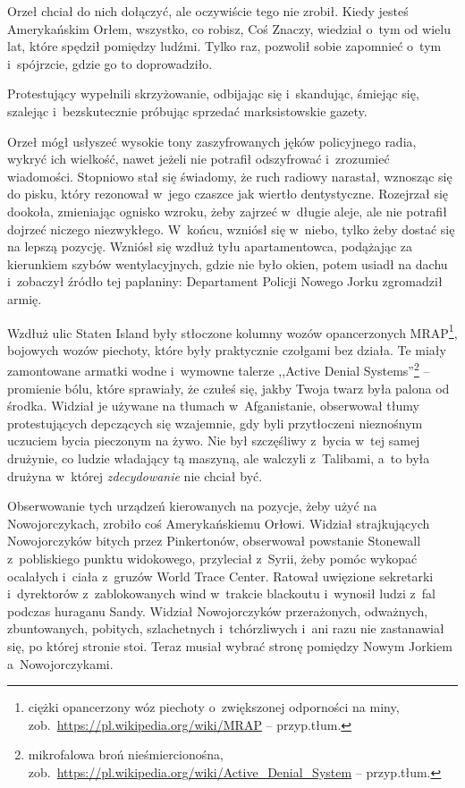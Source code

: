 \documentclass[oneside,polish,11pt,sfheadings]{mwbk}
\begin{document}
Orzeł chciał do nich dołączyć, ale oczywiście tego nie zrobił. Kiedy
jesteś Amerykańskim Orłem, wszystko, co robisz, Coś Znaczy, wiedział o~tym od wielu lat, które spędził pomiędzy ludźmi. Tylko raz, pozwolił
sobie zapomnieć o~tym i~spójrzcie, gdzie go to doprowadziło.

Protestujący wypełnili skrzyżowanie, odbijając się i~skandując, śmiejąc
się, szalejąc i~bezskutecznie próbując sprzedać marksistowskie gazety.

Orzeł mógł usłyszeć wysokie tony zaszyfrowanych jęków policyjnego radia,
wykryć ich wielkość, nawet jeżeli nie potrafił odszyfrować i~zrozumieć
wiadomości. Stopniowo stał się świadomy, że ruch radiowy narastał,
wznosząc się do pisku, który rezonował w~jego czaszce jak wiertło
dentystyczne. Rozejrzał się dookoła, zmieniając ognisko wzroku, żeby
zajrzeć w~długie aleje, ale nie potrafił dojrzeć niczego niezwykłego. W~końcu, wzniósł się w~niebo, tylko żeby dostać się na lepszą pozycję.
Wzniósł się wzdłuż tyłu apartamentowca, podążając za kierunkiem szybów
wentylacyjnych, gdzie nie było okien, potem usiadł na dachu i~zobaczył
źródło tej paplaniny: Departament Policji Nowego Jorku zgromadził armię.

Wzdłuż ulic Staten Island były stłoczone kolumny wozów opancerzonych
MRAP\footnote{ ciężki opancerzony wóz piechoty o~zwiększonej odporności na
miny, zob.~\url{https://pl.wikipedia.org/wiki/MRAP} -- przyp.tłum.}, bojowych wozów piechoty, które były praktycznie czołgami
bez działa. Te miały zamontowane armatki wodne i~wymowne talerze
,,Active Denial Systems''\footnote{ mikrofalowa broń
nieśmiercionośna,
zob.~\url{https://pl.wikipedia.org/wiki/Active\_Denial\_System}
-- przyp.tłum.} -- promienie bólu, które sprawiały, że czułeś się, jakby
Twoja twarz była palona od środka. Widział je używane na tłumach w~Afganistanie, obserwował tłumy protestujących depczących się wzajemnie,
gdy byli przytłoczeni nieznośnym uczuciem bycia pieczonym na żywo. Nie
był szczęśliwy z~bycia w~tej samej drużynie, co ludzie władający tą
maszyną, ale walczyli z~Talibami, a~to była drużyna w~której
\textit{zdecydowanie} nie chciał być.

Obserwowanie tych urządzeń kierowanych na pozycje, żeby użyć na
Nowojorczykach, zrobiło coś Amerykańskiemu Orłowi. Widział strajkujących
Nowojorczyków bitych przez Pinkertonów, obserwował powstanie Stonewall z~pobliskiego punktu widokowego, przyleciał z~Syrii, żeby pomóc wykopać
ocalałych i~ciała z~gruzów World Trace Center. Ratował uwięzione
sekretarki i~dyrektorów z~zablokowanych wind w~trakcie blackoutu i~wynosił ludzi z~fal podczas huraganu Sandy. Widział Nowojorczyków
przerażonych, odważnych, zbuntowanych, pobitych, szlachetnych i~tchórzliwych i~ani razu nie zastanawiał się, po której stronie stoi.
Teraz musiał wybrać stronę pomiędzy Nowym Jorkiem a~Nowojorczykami.
\end{document}
